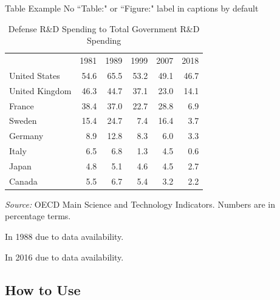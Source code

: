 \documentclass[11pt, aspectratio=43]{beamer}
\begin{document}
\begin{frame}{Table Example}
    No ``Table:" or ``Figure:" label in captions by default
    \begin{table}[h]
        \centering
        \begin{threeparttable}
            \caption{Defense R\&D Spending to Total Government R\&D Spending}
            \label{tab:def_rd}
            \begin{tabular}{lrrrrr}
                \toprule
                & 1981 & 1989 & 1999 & 2007 & 2018\\
                \cmidrule{2-6} \cmidrule{3-6} \cmidrule{4-6} \cmidrule{5-6} \cmidrule{6-6} 
                United States & 54.6 & 65.5 & 53.2 & 49.1 & 46.7\\
                United Kingdom & 46.3 & 44.7 & 37.1 & 23.0 & 14.1\\
                France & 38.4 & 37.0 & 22.7 & 28.8 & 6.9\\
                Sweden & 15.4 & 24.7 & 7.4 & 16.4 & 3.7\\
                Germany & 8.9 & 12.8 & 8.3 & 6.0 & 3.3\\
                Italy & 6.5 & 6.8 & 1.3 & 4.5 & 0.6\\
                Japan & 4.8{\footnotesize{}\tnote{\textdagger}} & 5.1 & 4.6 & 4.5 & 2.7\\
                Canada & 5.5 & 6.7 & 5.4 & 3.2 & 2.2{\footnotesize{}\tnote{\textdaggerdbl}}\\
            \bottomrule
        \end{tabular}
        \begin{tablenotes}
            \scriptsize
            \item[] \textit{Source:} OECD Main Science and Technology Indicators. Numbers are in percentage terms.
            \item[\textdagger] In 1988 due to data availability.
            \item[\textdaggerdbl] In 2016 due to data availability.
        \end{tablenotes}
        \end{threeparttable}
    \end{table}
\end{frame}

\subsection{How to Use}
\begin{tframe}
\end{tframe}
\end{document}
